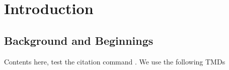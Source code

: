\chapter{Introduction}\label{chap:intro}
\section{Background and Beginnings}\label{sec:background_begin}

Contents here, test the citation command \cite{Huang_et_al_ReliableExfoliationTechniques_ACSnano2015}. We use the following TMDs  \cite{Schroder_SemiconductrMaterialDeviceCharacterization2006}
